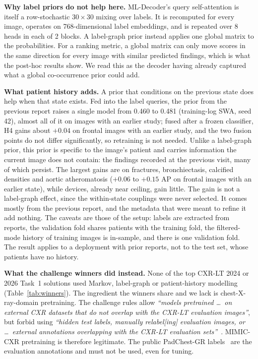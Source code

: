 \documentclass[conference]{IEEEtran}
\begin{document}
\textbf{Why label priors do not help here.} ML-Decoder's query self-attention is itself a row-stochastic $30 \times 30$ mixing over labels. It is recomputed for every image, operates on 768-dimensional label embeddings, and is repeated over 8 heads in each of 2 blocks. A label-graph prior instead applies one global matrix to the probabilities. For a ranking metric, a global matrix can only move scores in the same direction for every image with similar predicted findings, which is what the post-hoc results show. We read this as the decoder having already captured what a global co-occurrence prior could add.

\textbf{What patient history adds.} A prior that conditions on the previous state does help when that state exists. Fed into the label queries, the prior from the previous report raises a single model from 0.460 to 0.481 (training-log SWA, seed 42), almost all of it on images with an earlier study; fused after a frozen classifier, H4 gains about $+0.04$ on frontal images with an earlier study, and the two fusion points do not differ significantly, so retraining is not needed. Unlike a label-graph prior, this prior is specific to the image's patient and carries information the current image does not contain: the findings recorded at the previous visit, many of which persist. The largest gains are on fractures, bronchiectasis, calcified densities and aortic atheromatosis ($+0.06$ to $+0.15$ AP on frontal images with an earlier state), while devices, already near ceiling, gain little. The gain is not a label-graph effect, since the within-state couplings were never selected. It comes mostly from the previous report, and the metadata that were meant to refine it add nothing. The caveats are those of the setup: labels are extracted from reports, the validation fold shares patients with the training fold, the filtered-mode history of training images is in-sample, and there is one validation fold. The result applies to a deployment with prior reports, not to the test set, whose patients have no history.

\textbf{What the challenge winners did instead.} None of the top CXR-LT 2024 or 2026 Task~1 solutions used Markov, label-graph or patient-history modelling (Table~\ref{tab:winners}). The ingredient the winners share and we lack is chest-X-ray-domain pretraining. The challenge rules allow \emph{``models pretrained \ldots\ on external CXR datasets that do not overlap with the CXR-LT evaluation images''}, but forbid using \emph{``hidden test labels, manually relabel[ing] evaluation images, or \ldots\ external annotations overlapping with the CXR-LT evaluation sets''}~\cite{b14}. MIMIC-CXR pretraining is therefore legitimate. The public PadChest-GR labels~\cite{b10} are the evaluation annotations and must not be used, even for tuning.
\end{document}
